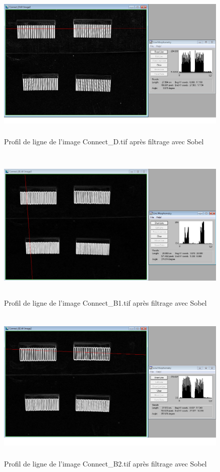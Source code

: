 \documentclass{scrreprt}
\begin{document}
\begin{figure}[!h]
\centering
\includegraphics[height=7.5cm,width=15cm]{images/connectDlineSobel.png}
\caption{Profil de ligne de l'image Connect_D.tif après filtrage avec Sobel}
\end{figure}

\newpage
\begin{figure}[!h]
\centering
\includegraphics[height=7.5cm,width=15cm]{images/connectB1lineSobel.png}
\caption{Profil de ligne de l'image Connect_B1.tif après filtrage avec Sobel}
\end{figure}

\begin{figure}[!h]
\centering
\includegraphics[height=7.5cm,width=15cm]{images/connectB2lineSobel.png}
\caption{Profil de ligne de l'image Connect_B2.tif après filtrage avec Sobel}
\end{figure}
\end{document}
